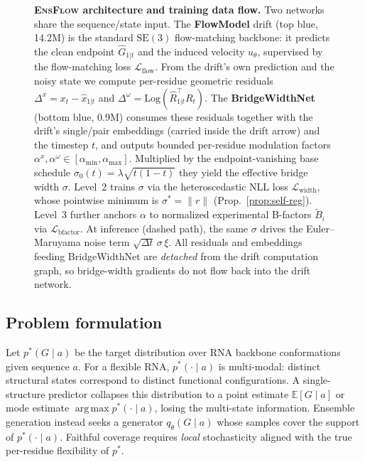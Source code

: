 \documentclass{article}
\theoremstyle{remark}
\theoremstyle{definition}
\newcommand{\E}{\mathbb{E}}
\newcommand{\SE}{\mathrm{SE}}
\newcommand{\Log}{\mathrm{Log}}
\DeclareMathOperator*{\argmax}{arg\,max}
\begin{document}
\begin{figure}[t]
\begin{tikzpicture}
\end{tikzpicture}
\caption{\textbf{\textsc{EnsFlow} architecture and training data flow.}
Two networks share the sequence/state input. The \textbf{FlowModel} drift
(top blue, 14.2M) is the standard $\SE(3)$ flow-matching backbone: it
predicts the clean endpoint $\hat G_{1|t}$ and the induced velocity
$u_\theta$, supervised by the flow-matching loss $\mathcal{L}_{\mathrm{flow}}$.
From the drift's own prediction and the noisy state we compute per-residue
geometric residuals $\Delta^x = x_t-\hat x_{1|t}$ and
$\Delta^\omega = \Log(\hat R_{1|t}^{\!\top}R_t)$. The
\textbf{BridgeWidthNet} (bottom blue, 0.9M) consumes these residuals together
with the drift's single/pair embeddings (carried inside the drift arrow) and
the timestep $t$, and outputs bounded per-residue modulation factors
$\alpha^x,\alpha^\omega\in[\alpha_{\min},\alpha_{\max}]$. Multiplied by the
endpoint-vanishing base schedule $\sigma_0(t)=\lambda\sqrt{t(1-t)}$ they yield
the effective bridge width $\sigma$. Level~2 trains $\sigma$ via the
heteroscedastic NLL loss $\mathcal{L}_{\mathrm{width}}$, whose pointwise
minimum is $\sigma^{\ast}=\|r\|$ (Prop.~\ref{prop:self-reg}). Level~3 further
anchors $\alpha$ to normalized experimental B-factors $\tilde B_i$ via
$\mathcal{L}_{\mathrm{bfactor}}$. At inference (dashed path), the same
$\sigma$ drives the Euler--Maruyama noise term $\sqrt{\Delta t}\,\sigma\,\xi$.
All residuals and embeddings feeding BridgeWidthNet are \emph{detached} from
the drift computation graph, so bridge-width gradients do not flow back into
the drift network.}
\label{fig:architecture}
\end{figure}

\subsection{Problem formulation}
\label{subsec:problem}

Let $p^{\ast}(G\mid a)$ be the target distribution over RNA backbone
conformations given sequence $a$. For a flexible RNA, $p^{\ast}(\cdot\mid a)$
is multi-modal: distinct structural states correspond to distinct functional
configurations. A single-structure predictor collapses this distribution to a
point estimate $\E[G\mid a]$ or mode estimate $\argmax p^{\ast}(\cdot\mid a)$,
losing the multi-state information. Ensemble generation instead seeks a
generator $q_\theta(G\mid a)$ whose samples cover the support of
$p^{\ast}(\cdot\mid a)$. Faithful coverage requires \emph{local} stochasticity
aligned with the true per-residue flexibility of $p^{\ast}$.
\end{document}
